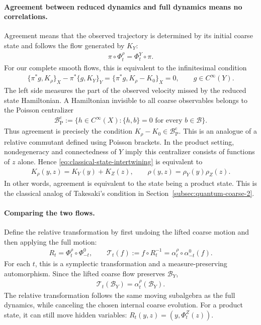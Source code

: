 \documentclass[a4paper,11pt]{article}
\theoremstyle{definition}
\theoremstyle{remark}
\newcommand{\mB}{\mathcal{B}}
\begin{document}
\paragraph{Agreement between reduced dynamics and full dynamics means no correlations.}
Agreement means that the observed trajectory is determined by its initial coarse state
and follows the flow generated by $K_Y$:
\begin{align}\label{eq:classical-state-intertwining}
    \pi\circ\Phi_t^\rho=\Phi_t^Y\circ\pi.
\end{align}
For our complete smooth flows, this is equivalent to the infinitesimal condition
\begin{align}\label{eq:classical-state-defect}
    \{\pi^*g,K_\rho\}_X-\pi^*\{g,K_Y\}_Y
    =\{\pi^*g,K_\rho-K_0\}_X=0,\qquad g\in C^\infty(Y).
\end{align}
The left side measures the part of the observed velocity missed by the reduced state
Hamiltonian.  A Hamiltonian invisible to all coarse observables belongs to the Poisson
centralizer
\begin{align}
    \mathcal{B}^{\mathrm{c}}_{\mathrm{P}}
    :=\{h\in C^\infty(X):\{h,b\}=0\text{ for every }b\in\mathcal{B}\}.
\end{align}
Thus agreement is precisely the condition $K_\rho-K_0\in\mathcal{B}^{\mathrm{c}}_{\mathrm{P}}$.
This is an analogue of a relative commutant defined using Poisson brackets.  In the
product setting, nondegeneracy and connectedness of $Y$ imply this centralizer consists
of functions of $z$ alone.  Hence \eqref{eq:classical-state-intertwining} is equivalent to
\begin{align}\label{eq:classical-product-state-closure}
    K_\rho(y,z)=K_Y(y)+K_Z(z),\qquad
    \rho(y,z)=\rho_Y(y)\rho_Z(z).
\end{align}
In other words, agreement is equivalent to the state being a product state.  This is
the classical analog of Takesaki's condition in Section~\ref{subsec:quantum-coarse-2}.
 
\paragraph{Comparing the two flows.}
Define the relative transformation by first undoing the lifted coarse motion and then
applying the full motion:
\begin{align}\label{eq:classical-relative-transformation}
    R_t=\Phi_t^\rho\circ\Phi_{-t}^0,\qquad
    \mathcal{T}_t(f):=f\circ R_t^{-1}=\alpha_t^\rho\circ\alpha_{-t}^0(f).
\end{align}
For each $t$, this is a symplectic transformation and a measure-preserving
automorphism.  Since the lifted coarse flow preserves $\mB_Y$,
\begin{align}
    \mathcal{T}_t(\mB_Y)=\alpha_t^\rho(\mB_Y).
\end{align}
The relative transformation follows the same moving subalgebra as the full dynamics,
while canceling the chosen internal coarse evolution.  For a product state, it can
still move hidden variables: $R_t(y,z)=(y,\Phi_t^Z(z))$.
 
\end{document}
